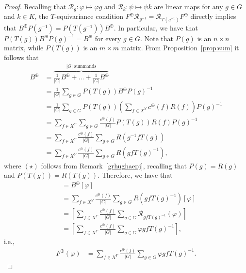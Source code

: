 \documentclass[11pt]{article}
\newcommand{\p}{\varphi}
\begin{document}
\begin{proof}
    Recalling that $\mathcal{R}_g \colon \varphi \mapsto \varphi g$ and $\mathcal{R}_k \colon \psi \mapsto \psi k $ are linear maps for any $g \in G$ and $k \in K$, the $T$-equivariance condition $F^\oplus \mathcal{R}_{g^{-1}} = \mathcal{R}_{T(g^{-1})}F^\oplus$ directly implies that $B^\oplus P(g^{-1}) = P\left(T(g^{-1})\right)B^\oplus$. In particular, we have that $P\left(T(g)\right)B^\oplus P(g)^{-1} = B^\oplus$ for every $g \in G$. Note that $P(g)$ is an $n\times n$ matrix, while $P(T(g))$ is an $m\times m$ matrix. From Proposition~\ref{prop:sum} it follows that
    \begin{align*}
        B^\oplus & = \overbrace{\frac{1}{\left|G\right|}B^\oplus + \dots + \frac{1}{\left|G\right|}B^\oplus}^{\left|G\right| \text{ summands}} \\
        & = \frac{1}{\left|G\right|}\sum_{g \in G}P(T(g))B^\oplus P(g)^{-1} \\
        & = \frac{1}{\left|G\right|}\sum_{g \in G}P(T(g))\left(\sum_{f \in X^Y} c^\oplus(f)R(f)\right)P(g)^{-1} \\
        & = \sum_{f \in X^Y}\sum_{g \in G}\frac{c^\oplus(f)}{\left|G\right|} P(T(g))R(f)P(g)^{-1} \\
        & = \sum_{f \in X^Y}\frac{c^\oplus(f)}{\left|G\right|}\sum_{g \in G} R\left(g^{-1}fT(g)\right) \tag{$\star$} \\
        & = \sum_{f \in X^Y}\frac{c^\oplus(f)}{\left|G\right|}\sum_{g \in G} R\left(gfT(g)^{-1}\right),
    \end{align*}
    where $(\star)$ follows from Remark~\ref{grhughaepj}, recalling that $P(g)=R(g)$ and $P(T(g))=R(T(g))$. Therefore, we have that
    \begin{align}
        [F^\oplus(\varphi)] & = B^\oplus[\p] \nonumber\\
        & = \sum_{f \in X^Y} \frac{c^\oplus(f)}{\left|G\right|} \sum_{g \in G} R\left(gfT(g)^{-1}\right)[\varphi] \nonumber \\
        & = \left[\sum_{f \in X^Y} \frac{c^\oplus(f)}{\left|G\right|} \sum_{g \in G} \mathcal{R}_{gfT(g)^{-1}}(\varphi)\right] \nonumber\\
        & = \left[\sum_{f \in X^Y} \frac{c^\oplus(f)}{\left|G\right|} \sum_{g \in G} \varphi g f T(g)^{-1}\right],\nonumber
    \end{align}
    i.e., 
    \begin{align}
    \label{eq:conj}
        F^\oplus(\varphi) & = \sum_{f \in X^Y} \frac{c^\oplus(f)}{\left|G\right|} \sum_{g \in G} \varphi g f T(g)^{-1}.

\end{align}
\end{proof}
\end{document}
